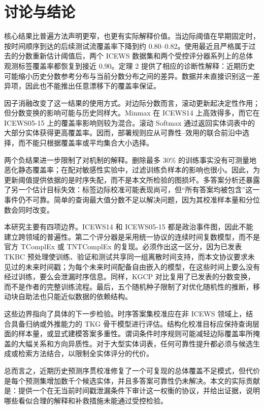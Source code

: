 \documentclass[UTF8,a4paper,11pt]{ctexart}
\begin{document}
\section{讨论与结论}

核心结果比普遍方法声明更窄，也更有实际解释价值。当边际阈值在早期固定时，按时间顺序到达的后续测试流覆盖率下降到约 0.80--0.82。使用最近且严格属于过去的分数重新估计阈值后，两个 ICEWS 数据集和两个受控评分器系列上的总体观测标签覆盖率都恢复到接近 0.90。定理 2 提供了相应的诊断性解释：近期历史可能缩小历史分数参考分布与当前分数分布之间的差异。数据并未直接识别这一差异项，因此也不能推出任意漂移下的覆盖率保证。

因子消融改变了这一结果的使用方式。对边际分数而言，滚动更新起决定性作用；但分数变换的影响可能与历史同样大。Minmax 在 ICEWS14 上高效得多，而它在 ICEWS05-15 上的覆盖率影响则较为混合。滚动 Softmax 通过返回实体词表中的大部分实体获得更高覆盖率。因而，部署规则应从可靠性--效用的联合前沿中选择，而不能只根据覆盖率或平均集合大小选择。

两个负结果进一步限制了对机制的解释。删除最多 30\% 的训练事实没有可测量地恶化静态覆盖率；在配对敏感性实验中，过滤训练负样本的影响也很小。因此，为更新阈值提供依据的是时序失配，而不是本文所检验的图损坏。多答案分析还暴露了另一个估计目标失效：标签边际校准可能表现尚可，但“所有答案均被包含”这一事件仍不可靠。简单的查询最大值分数不足以解决问题，因为其校准样本量和分位数会同时改变。

本研究主要有四项边界。ICEWS14 和 ICEWS05-15 都是政治事件图，因此不能建立跨领域的普遍性。第二个评分器是采用统一协议的连续时间复数模型，而不是官方 TComplEx 或 TNTComplEx 的复现。必须作出这一区分，因为已发表 TKBC 预处理使训练、验证和测试共享同一组离散时间支持，而本文协议要求未见过的未来时间戳；为每个未来时间配备自由嵌入的模型，在这些时间上要么没有经过训练，要么会泄漏时序信息。同样，KGCP 对比复用了已发表的分数变换，而不是作者的完整训练流程。最后，五个随机种子限制了对优化随机性的推断，移动块自助法也只能近似数据的依赖结构。

这些边界指向了具体的下一步检验。时序答案集校准应在非 ICEWS 领域上，结合具备归纳或外推能力的 TKG 骨干模型进行评估。结构化校准目标应保持查询层面的样本量，或显式建模答案多重性。谓词条件时序规则可能减轻边际覆盖率所掩盖的大幅关系和方向异质性。对于大型实体词表，任何可靠性提升都必须与候选生成或检索方法结合，以限制全实体评分的代价。

总而言之，近期历史预测序贯校准修复了一个可复现的总体覆盖不足模式，但代价是每个预测集增加数千个候选实体，并且多答案可靠性仍未解决。本文的实际贡献是：提供一个在无当前时间戳泄漏条件下审计这一权衡的协议，并给出证据，说明哪些看似合理的解释和补救措施未能通过受控检验。
\end{document}
